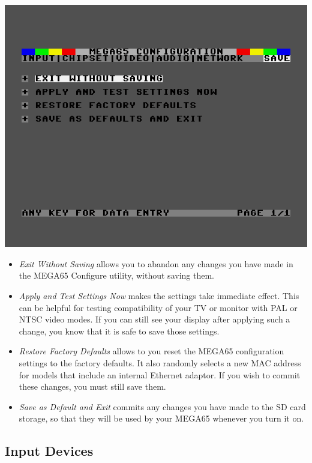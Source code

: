 \includegraphics[width=\linewidth]{images/ss-m65config-save.png}

\begin{itemize}
  \item{\em Exit Without Saving} allows you to abandon any changes you
    have made in the MEGA65 Configure utility, without saving them.
  \item{\em Apply and Test Settings Now} makes the settings take
    immediate effect.  This can be helpful for testing compatibility
    of your TV or monitor with PAL or NTSC video modes.  If you can
    still see your display after applying such a change, you know
    that it is safe to save those settings.
  \item{\em Restore Factory Defaults} allows to you reset the
    MEGA65 configuration settings to the factory defaults. It also
    randomly selects a new MAC address for models that include an
    internal Ethernet adaptor.  If you wish to commit these
    changes, you must still save them.
  \item{\em Save as Default and Exit} commits any changes you
    have made to the SD card storage, so that they will be used
    by your MEGA65 whenever you turn it on.
\end{itemize}

\subsection{Input Devices}

